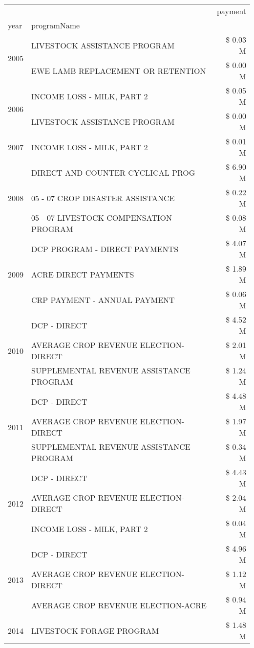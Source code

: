 \begin{tabular}{llr}
\toprule
 &  & payment \\
year & programName &  \\
\midrule
\multirow[t]{2}{*}{2005} & LIVESTOCK ASSISTANCE PROGRAM & \$ 0.03 M \\
 & EWE LAMB REPLACEMENT OR RETENTION & \$ 0.00 M \\
\cline{1-3}
\multirow[t]{2}{*}{2006} & INCOME LOSS - MILK, PART 2 & \$ 0.05 M \\
 & LIVESTOCK ASSISTANCE PROGRAM & \$ 0.00 M \\
\cline{1-3}
2007 & INCOME LOSS - MILK, PART 2 & \$ 0.01 M \\
\cline{1-3}
\multirow[t]{3}{*}{2008} & DIRECT AND COUNTER CYCLICAL PROG & \$ 6.90 M \\
 & 05 - 07 CROP DISASTER ASSISTANCE & \$ 0.22 M \\
 & 05 - 07 LIVESTOCK COMPENSATION PROGRAM & \$ 0.08 M \\
\cline{1-3}
\multirow[t]{3}{*}{2009} & DCP PROGRAM - DIRECT PAYMENTS & \$ 4.07 M \\
 & ACRE DIRECT PAYMENTS & \$ 1.89 M \\
 & CRP PAYMENT - ANNUAL PAYMENT & \$ 0.06 M \\
\cline{1-3}
\multirow[t]{3}{*}{2010} & DCP - DIRECT & \$ 4.52 M \\
 & AVERAGE CROP REVENUE ELECTION-DIRECT & \$ 2.01 M \\
 & SUPPLEMENTAL REVENUE ASSISTANCE PROGRAM & \$ 1.24 M \\
\cline{1-3}
\multirow[t]{3}{*}{2011} & DCP - DIRECT & \$ 4.48 M \\
 & AVERAGE CROP REVENUE ELECTION-DIRECT & \$ 1.97 M \\
 & SUPPLEMENTAL REVENUE ASSISTANCE PROGRAM & \$ 0.34 M \\
\cline{1-3}
\multirow[t]{3}{*}{2012} & DCP - DIRECT & \$ 4.43 M \\
 & AVERAGE CROP REVENUE ELECTION-DIRECT & \$ 2.04 M \\
 & INCOME LOSS - MILK, PART 2 & \$ 0.04 M \\
\cline{1-3}
\multirow[t]{3}{*}{2013} & DCP - DIRECT & \$ 4.96 M \\
 & AVERAGE CROP REVENUE ELECTION-DIRECT & \$ 1.12 M \\
 & AVERAGE CROP REVENUE ELECTION-ACRE & \$ 0.94 M \\
\cline{1-3}
\multirow[t]{3}{*}{2014} & LIVESTOCK FORAGE PROGRAM & \$ 1.48 M \\

\end{tabular}
